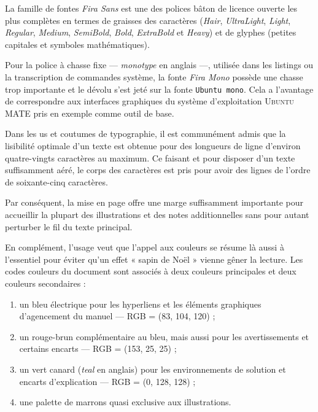 La famille de fontes \textit{Fira Sans} est une des polices bâton de licence ouverte les plus complètes en termes de graisses des caractères (\textit{Hair}, \textit{UltraLight}, \textit{Light}, \textit{Regular}, \textit{Medium}, \textit{SemiBold}, \textit{Bold}, \textit{ExtraBold} et \textit{Heavy}) et de glyphes (petites capitales et symboles mathématiques).

Pour la police à chasse fixe --- \textit{monotype} en anglais ---, utilisée dans les listings ou la transcription de commandes système, la fonte \textit{Fira Mono} possède une chasse trop importante et le dévolu s'est jeté sur la fonte \texttt{Ubuntu mono}. Cela a l'avantage de correspondre aux interfaces graphiques du système d'exploitation \textsc{Ubuntu MATE} pris en exemple comme outil de base.

Dans les us et coutumes de typographie, il est communément admis que la lisibilité optimale d'un texte est obtenue pour des longueurs de ligne d'environ quatre-vingts caractères au maximum. Ce faisant et pour disposer d'un texte suffisamment aéré, le corps des caractères est pris pour avoir des lignes de l'ordre de soixante-cinq caractères. 

Par conséquent, la mise en page offre une marge suffisamment importante pour accueillir la plupart des illustrations et des notes additionnelles sans pour autant perturber le fil du texte principal.

En complément, l'usage veut que l'appel aux couleurs se résume là aussi à l'essentiel pour éviter qu'un effet « sapin de Noël » vienne gêner la lecture. Les codes couleurs du document sont associés à deux couleurs principales et deux couleurs secondaires :
\begin{enumerate}
\item un \textcolor{firstcolor}{bleu électrique} pour les hyperliens et les éléments graphiques d'agencement du manuel --- RGB = (83, 104, 120) ;
\item un \textcolor{secondcolor}{rouge-brun} complémentaire au bleu, mais aussi pour les avertissements et certains encarts --- RGB = (153, 25, 25) ;
\item un \textcolor{thirdcolor}{vert canard} (\textit{teal} en anglais) pour les environnements de solution et encarts d'explication --- RGB = (0, 128, 128) ;
\item une \textcolor{fourthcolor}{palette de marrons} quasi exclusive aux illustrations.
\end{enumerate}

